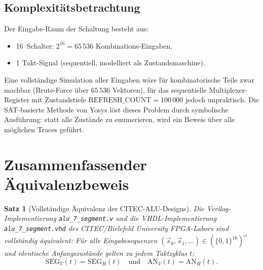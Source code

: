 ﻿\documentclass[12pt,a4paper]{report}
\newtheorem{theorem}{Satz}[section]
\begin{document}
\subsection{Komplexitätsbetrachtung}

Der Eingabe-Raum der Schaltung besteht aus:
\begin{itemize}
	\item 16~Schalter: $2^{16} = 65\,536$ Kombinations-Eingaben,
	\item 1 Takt-Signal (sequentiell, modelliert als Zustandsmaschine).
\end{itemize}

Eine vollständige Simulation aller Eingaben wäre für kombinatorische Teile
zwar machbar (Brute-Force über $65\,536$ Vektoren), für das sequentielle
Multiplexer-Register mit Zustandstiefe
$\text{REFRESH\_COUNT} = 100\,000$ jedoch unpraktisch.  Die
SAT-basierte Methode von Yosys löst dieses Problem durch symbolische
Ausführung: statt alle Zustände zu enumerieren, wird ein Beweis über alle
möglichen Traces geführt.

\section{Zusammenfassender Äquivalenzbeweis}
\label{subsec:hauptsatz}

\begin{theorem}[Vollständige Äquivalenz der CITEC-ALU-Designs]
	\label{thm:hauptsatz_vv}
	Die Verilog-Implemen\-tierung \texttt{alu\_7\_segment.v} und die
	VHDL-Implementierung \texttt{alu\_7\_segment.vhd} des CITEC/Bielefeld
	University FPGA-Labors sind vollständig äquivalent: Für alle
	Eingabesequenzen $(\vec{s}_0, \vec{s}_1, \ldots) \in (\{0,1\}^{16})^\omega$
	und identische Anfangszustände gelten zu jedem Taktzyklus $t$:
	\[
	\mathrm{SEG}_V(t) = \mathrm{SEG}_H(t)
	\quad\text{und}\quad
	\mathrm{AN}_V(t) = \mathrm{AN}_H(t).
	\]
\end{theorem}
\end{document}
